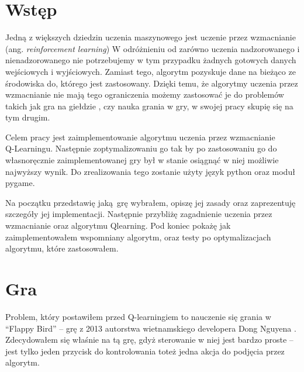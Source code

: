 \documentclass[a4paper,12pt,oneside]{book}
\newcommand\chap[1]{%
  \chapter*{#1}%
  \addcontentsline{toc}{chapter}{#1}}
\begin{document}
\sloppy
\thispagestyle{empty}

\newpage{}

\thispagestyle{empty}
\newpage{}

\tableofcontents{}
\newpage


\chap{Wstęp}
Jedną z większych dziedzin uczenia maszynowego jest uczenie przez wzmacnianie 
(ang. \textit{reinforcement learning}) W odróżnieniu od zarówno uczenia 
nadzorowanego i nienadzorowanego nie potrzebujemy w tym przypadku żadnych
gotowych danych wejściowych i wyjściowych. Zamiast tego, algorytm pozyskuje
dane na bieżąco ze środowiska do, którego jest zastosowany. Dzięki temu,
że algorytmy uczenia przez wzmacnianie nie mają tego ograniczenia możemy
zastosować je do problemów takich jak gra na giełdzie
\cite{trading_reinforcement}, czy nauka grania w gry, w swojej pracy
skupię się na tym drugim.

Celem pracy jest zaimplementowanie algorytmu uczenia przez wzmacnianie\\
Q-Learningu. Następnie zoptymalizowaniu go tak by po zastosowaniu go do
własnoręcznie zaimplementowanej gry był w stanie osiągnąć w niej możliwie
najwyższy wynik. Do zrealizowania tego zostanie użyty język python oraz moduł
pygame.

Na początku przedstawię jaką grę wybrałem, opiszę jej zasady oraz zaprezentuję
szczegóły jej implementacji. Następnie  przybliżę zagadnienie uczenia przez
wzmacnianie oraz algorytmu Q\dywiz learning. Pod koniec pokażę jak
zaimplementowałem wspomniany algorytm, oraz testy po optymalizacjach algorytmu,
które zastosowałem.
\newpage{}

\chapter{Gra}
Problem, który postawiłem przed Q-learningiem to nauczenie się grania w
``Flappy Bird'' -- grę z 2013 autorstwa wietnamskiego developera Dong Nguyena
\cite{flappy_bird_author}. Zdecydowałem się właśnie na tą grę,
gdyż sterowanie w niej jest bardzo proste -- jest tylko jeden przycisk do
kontrolowania toteż jedna akcja do podjęcia przez algorytm.
\end{document}
